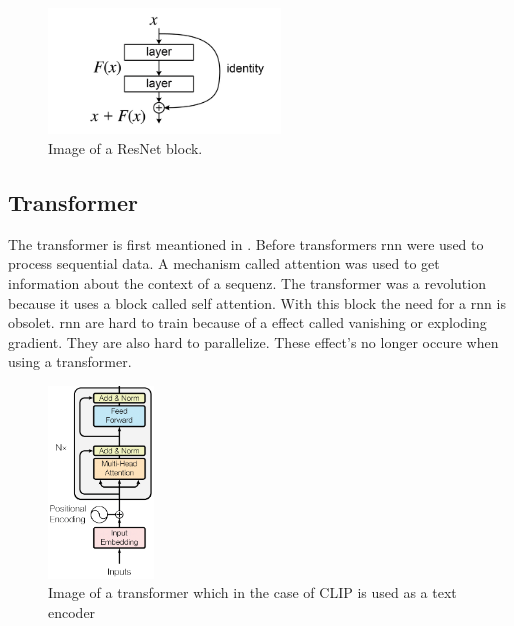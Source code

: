     \begin{figure}[h]
        \centering
        \includegraphics[width=0.55\textwidth]{Images/crossmodalnetworks/ResBlock.png}
        \caption{Image of a ResNet block.\cite{resnetpaper}}
        \label{fig:crossmodalnetworks:resblock}
    \end{figure}

    \subsection{Transformer}

    The transformer is first meantioned in \cite{attentionisallyouneed}.
    Before transformers \acrfull{rnn} were used to process sequential data.
    A mechanism called attention was used to get information about the context of a sequenz.
    The transformer was a revolution because it uses a  block called self attention.
    With this block the need for a \acrshort{rnn} is obsolet.
    \acrshort{rnn} are hard to train because of a effect called vanishing or exploding gradient.
    They are also hard to parallelize.
    These effect's no longer occure when using a transformer.

    \begin{figure}[h]
        \centering
        \includegraphics[width=0.25\textwidth]{Images/crossmodalnetworks/The-Transformer-encoder-structure.png}
        \caption{Image of a transformer which in the case of CLIP is used as a text encoder\cite{fig:encoder}}
        \label{fig:crossmodalnetworks:transformer}
    \end{figure}

